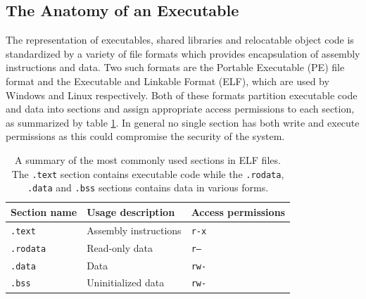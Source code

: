 %



\subsection{The Anatomy of an Executable}
\label{sec:executable_anatomy}

The representation of executables, shared libraries and relocatable object code is standardized by a variety of file formats which provides encapsulation of assembly instructions and data. Two such formats are the Portable Executable (PE) file format and the Executable and Linkable Format (ELF), which are used by Windows and Linux respectively. Both of these formats partition executable code and data into sections and assign appropriate access permissions to each section, as summarized by table \ref{tbl:elf_sections}. In general no single section has both write and execute permissions as this could compromise the security of the system.

\begin{table}[htbp]
	\begin{center}
		\begin{tabular}{|l|l|l|}
			\hline
			Section name & Usage description & Access permissions \\
			\hline
			\texttt{.text} & Assembly instructions & \texttt{r-x} \\
			\texttt{.rodata} & Read-only data & \texttt{r--} \\
			\texttt{.data} & Data & \texttt{rw-} \\
			\texttt{.bss} & Uninitialized data & \texttt{rw-} \\
			\hline
		\end{tabular}
	\end{center}
	\caption{A summary of the most commonly used sections in ELF files. The \texttt{.text} section contains executable code while the \texttt{.rodata}, \texttt{.data} and \texttt{.bss} sections contains data in various forms.}
	\label{tbl:elf_sections}
\end{table}

